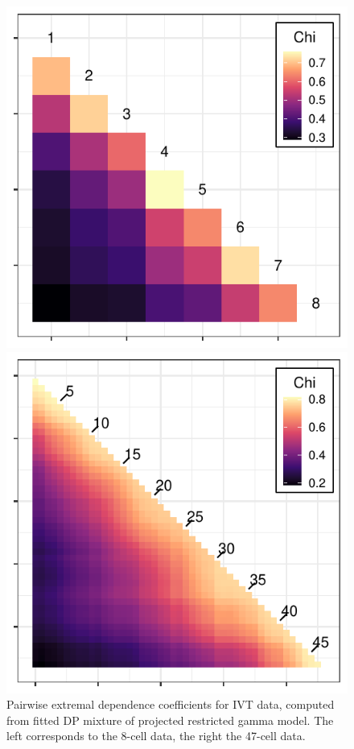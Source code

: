   \begin{figure}[ht!]
    \centering
    \caption{Pairwise extremal dependence coefficients for IVT data, computed from fitted DP
      mixture of projected restricted gamma model.  The left corresponds to the 8-cell data, the
      right the 47-cell data.\label{fig:chi_ij}}
    \begin{minipage}{.49\textwidth}
      \centering
      \includegraphics[width=0.99\linewidth]{./images/chi_ij_8}
    \end{minipage}
    \begin{minipage}{.49\textwidth}
      \centering
      \includegraphics[width=0.99\linewidth]{./images/chi_ij_46}
    \end{minipage}
  \end{figure}


